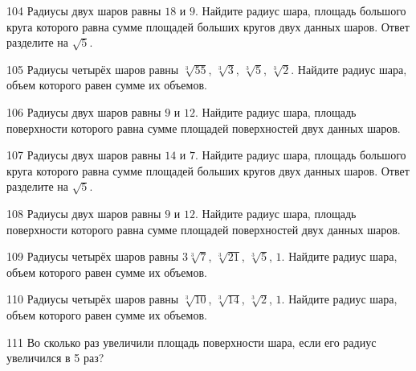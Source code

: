 \documentclass[a4paper]{article}
\begin{document}
\begin{taskBN}{104}
Радиусы двух шаров равны $18$ и $9$. Найдите радиус шара, площадь большого круга которого равна сумме площадей больших кругов двух данных шаров. Ответ разделите на $\sqrt{5}$.
\end{taskBN}

\begin{taskBN}{105}
Радиусы четырёх шаров равны $\sqrt[3]{55}$, $\sqrt[3]{3}$, $\sqrt[3]{5}$, $\sqrt[3]{2}$. Найдите радиус шара, объем которого равен сумме их объемов.
\end{taskBN}

\begin{taskBN}{106}
Радиусы двух шаров равны $9$ и $12$. Найдите радиус шара, площадь поверхности которого равна сумме площадей поверхностей двух данных шаров.
\end{taskBN}

\begin{taskBN}{107}
Радиусы двух шаров равны $14$ и $7$. Найдите радиус шара, площадь большого круга которого равна сумме площадей больших кругов двух данных шаров. Ответ разделите на $\sqrt{5}$.
\end{taskBN}

\begin{taskBN}{108}
Радиусы двух шаров равны $9$ и $12$. Найдите радиус шара, площадь поверхности которого равна сумме площадей поверхностей двух данных шаров.
\end{taskBN}

\begin{taskBN}{109}
Радиусы четырёх шаров равны $3\sqrt[3]{7}$, $\sqrt[3]{21}$, $\sqrt[3]{5}$, $1$. Найдите радиус шара, объем которого равен сумме их объемов.
\end{taskBN}

\begin{taskBN}{110}
Радиусы четырёх шаров равны $\sqrt[3]{10}$, $\sqrt[3]{14}$, $\sqrt[3]{2}$, $1$. Найдите радиус шара, объем которого равен сумме их объемов.
\end{taskBN}

\begin{taskBN}{111}
Во сколько раз увеличили площадь поверхности шара, если его радиус увеличился в 5 раз?
\end{taskBN}
\end{document}
